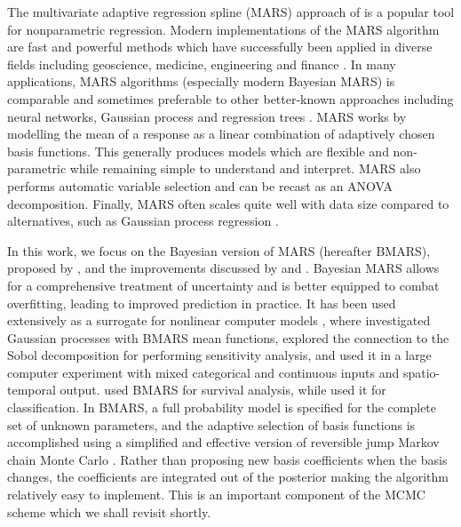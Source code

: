 \documentclass{article} %
\begin{document}
The multivariate adaptive regression spline (MARS) approach of \cite{friedman1991} is a popular tool for nonparametric regression. Modern implementations of the MARS algorithm are fast and powerful methods which have successfully been applied in diverse fields including geoscience, medicine, engineering and finance \citep{zhang2016multivariate, chou2004mining, roy2018estimating, de2011bankruptcy}. In many applications, MARS algorithms (especially modern Bayesian MARS) is comparable and sometimes preferable to other better-known approaches including neural networks, Gaussian process and regression trees \citep{hutchings2023comparing, collins2022bayesian, zhang2016multivariate}. MARS works by modelling the mean of a response as a linear combination of adaptively chosen basis functions. This generally produces models which are flexible and non-parametric while remaining simple to understand and interpret. MARS also performs automatic variable selection and can be recast as an ANOVA decomposition. Finally, MARS often scales quite well with data size compared to alternatives, such as Gaussian process regression \citep{rasmussen2003gaussian}.


In this work, we focus on the Bayesian version of MARS (hereafter BMARS), proposed by \citep{denison1998}, and the improvements discussed by \cite{nott2005} and \cite{francom2018}. Bayesian MARS allows for a comprehensive treatment of uncertainty and is better equipped to combat overfitting, leading to improved prediction in practice.  It has been used extensively as a surrogate for nonlinear computer models \citep{mcclarren2011}, where \cite{chakraborty2013} investigated Gaussian processes with BMARS mean functions, \cite{francom2018} explored the connection to the Sobol decomposition for performing sensitivity analysis, and \cite{francom2019} used it in a large computer experiment with mixed categorical and continuous inputs and spatio-temporal output.  \cite{mallick1999} used BMARS for survival analysis, while \cite{holmes2003classification} used it for classification. In BMARS, a full probability model is specified for the complete set of unknown parameters, and the adaptive selection of basis functions is accomplished using a simplified and effective version of reversible jump Markov chain Monte Carlo \citep{green1995}. Rather than proposing new basis coefficients when the basis changes, the coefficients are integrated out of the posterior making the algorithm relatively easy to implement. This is an important component of the MCMC scheme which we shall revisit shortly.
\end{document}
